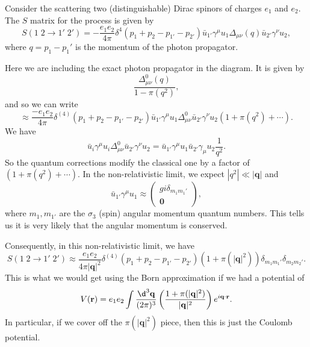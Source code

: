\documentclass[a4paper]{article}
\begin{document}
Consider the scattering two (distinguishable) Dirac spinors of charges $e_1$ and $e_2$. The $S$ matrix for the process is given by
\[
  S(1\; 2 \to 1'\;2') = - \frac{e_1e_2}{4\pi} \delta^4(p_1 + p_2 - p_{1'} - p_{2'})\bar{u}_{1'} \gamma^\mu u_1 \Delta_{\mu\nu}(q) \bar{u}_{2'} \gamma^\nu u_2,
\]
where $q = p_1 - p_1'$ is the momentum of the photon propagator.
\begin{center}
\end{center}
Here we are including the exact photon propagator in the diagram. It is given by
\[
  \frac{\Delta_{\mu\nu}^0(q)}{1 - \pi(q^2)},
\]
and so we can write
\[
  \approx \frac{-e_1 e_2}{4\pi} \delta^{(4)} (p_1 + p_2 - p_{1'} - p_{2'}) \bar{u}_{1'} \gamma^\mu u_1 \Delta_{\mu\nu}^0 \bar{u}_{2'} \gamma^\nu u_2 (1 + \pi(q^2) + \cdots).
\]
We have
\[
  \bar{u}_i \gamma^\mu u_i \Delta_{\mu\nu}^0\bar{u}_{2'} \gamma^\nu u_2 = \bar{u}_{1'} \gamma^\mu u_1 \bar{u}_{2'} \gamma_\mu u_2 \frac{1}{q^2}.
\]
So the quantum corrections modify the classical one by a factor of $(1 + \pi(q^2) + \cdots)$. In the non-relativistic limit, we expect $|q^2| \ll |\mathbf{q}|$ and
\[
  \bar{u}_{1'}\gamma^\mu u_1 \approx
  \begin{pmatrix}
    gi \delta_{m_1 m_1'}\\
    \mathbf{0}
  \end{pmatrix},
\]
where $m_1, m_{1'}$ are the $\sigma_3$ (spin) angular momentum quantum numbers. This tells us it is very likely that the angular momentum is conserved.

Consequently, in this non-relativistic limit, we have
\[
  S(1\;2 \to 1'\; 2') \approx \frac{e_1 e_2}{4\pi |\mathbf{q}|^2} \delta^{(4)} (p_1 + p_2 - p_{1'} - p_{2'}) (1 + \pi (|\mathbf{q}|^2)) \delta_{m_1 m_1'} \delta_{m_2 m_2'}.
\]
This is what we would get using the Born approximation if we had a potential of
\[
  V(\mathbf{r}) = e_1 e_2 \int \frac{\d^3 \mathbf{q}}{(2\pi)^3} \left(\frac{1 + \pi(|\mathbf{q}|^2)}{ |\mathbf{q}|^2}\right) e^{i\mathbf{q}\cdot \mathbf{r}}.
\]
In particular, if we cover off the $\pi(|\mathbf{q}|^2)$ piece, then this is just the Coulomb potential.
\end{document}
